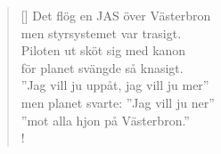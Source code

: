\documentclass[11pt, a4paper]{article} %
\begin{document}
\begin{verse}[\versewidth]
Det flög en JAS över Västerbron \\
men styrsystemet var trasigt. \\
Piloten ut sköt sig med kanon \\
för planet svängde så knasigt. \\
''Jag vill ju uppåt, jag vill ju mer''\\ 
men planet svarte: ''Jag vill ju ner'' \\
''mot alla hjon på Västerbron.'' \\!


\end{verse}

\end{document}
